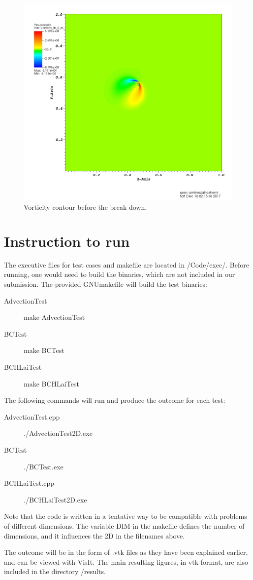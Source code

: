 \documentclass{article}
\begin{document}
       \begin{figure}
    \centering
     \includegraphics[scale=0.4]{fig2}
     \caption{Vorticity contour before the break down.}
   \end{figure}
\section{Instruction to run}

The executive files for test cases and makefile are located in /Code/exec/. Before running, one would need to build the binaries, which are not included in our submission. The provided GNUmakefile will build the test binaries:
\begin{description}
	\item[AdvectionTest] make AdvectionTest
	\item[BCTest] make BCTest
	\item[BCHLaiTest] make BCHLaiTest
\end{description}

The following commands will run and produce the outcome for each test:
\begin{description}
	\item[AdvectionTest.cpp] ./AdvectionTest2D.exe
	\item[BCTest] ./BCTest.exe
	\item[BCHLaiTest.cpp] ./BCHLaiTest2D.exe
\end{description}

Note that the code is written in a tentative way to be compatible with problems of different dimensions. The variable DIM in the makefile defines the number of dimensions, and it influences the 2D in the filenames above.

The outcome will be in the form of .vtk files as they have been explained earlier, and can be viewed with VisIt. The main resulting figures, in vtk format, are also included in the directory /results.



\end{document}
